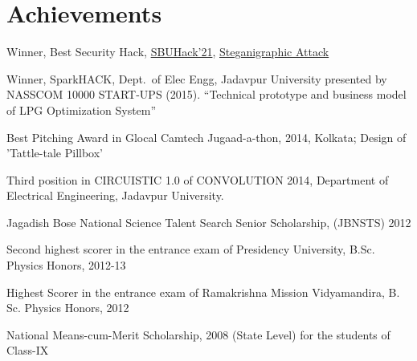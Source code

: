 \documentclass[letterpaper,10pt]{article}
\begin{document}
\section{Achievements}
\resumeSubHeadingListStart
\item {Winner, Best Security Hack, \href{https://sbuhacks.org}{SBUHack'21}, \href{https://devpost.com/software/steganography-attack}{Steganigraphic Attack}}
\item {Winner, SparkHACK, Dept.\ of Elec Engg, Jadavpur University presented by NASSCOM 10000 START-UPS (2015). ``Technical prototype and business model of LPG Optimization System''}
\item {Best Pitching Award in Glocal Camtech Jugaad-a-thon, 2014, Kolkata; Design of 'Tattle-tale Pillbox'}
\item {Third position in CIRCUISTIC 1.0 of CONVOLUTION 2014, Department of Electrical Engineering, Jadavpur University.}
\item {Jagadish Bose National Science Talent Search Senior Scholarship, (JBNSTS) 2012}
\item {Second highest scorer in the entrance exam of Presidency University, B.Sc. Physics Honors, 2012-13}
\item {Highest Scorer in the entrance exam of Ramakrishna Mission Vidyamandira, B. Sc. Physics Honors, 2012}
\item {National Means-cum-Merit Scholarship, 2008 (State Level) for the students of Class-IX} 
\resumeSubHeadingListEnd
\end{document}

